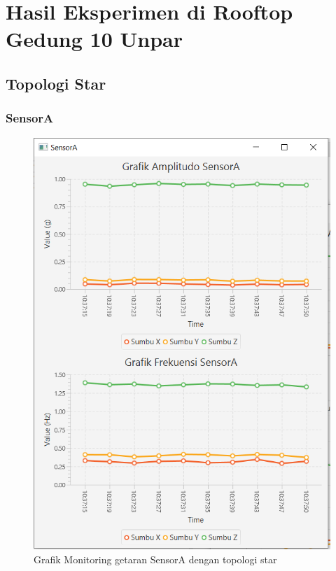 \chapter{Hasil Eksperimen di Rooftop Gedung 10 Unpar}
\label{lamp:C}

\section{Topologi Star}

\subsection{SensorA}
\begin{figure}[H] 
	\centering  
	\includegraphics[scale=1]{Lampiran/HasilPengujian/sensorA_starRooftop2.PNG} 
	\caption[Grafik Monitoring getaran SensorA dengan topologi star]{Grafik Monitoring getaran SensorA dengan topologi star}
	\label{fig:grafik_A_star_rooftop} 
\end{figure}

